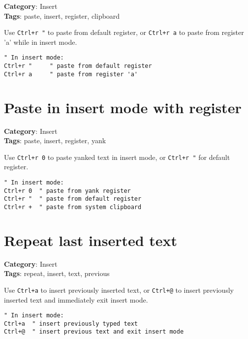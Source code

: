 {{{{{{\textbf{Category}: Insert\\ \textbf{Tags}: paste, insert, register, clipboard
\vspace{0.5cm}

Use {\footnotesize \Verb§Ctrl+r "§} to paste from default register, or {\footnotesize \Verb§Ctrl+r a§} to paste from register 'a' while in insert mode.

\begin{Exa*}{}
\begin{Verbatim}[fontsize=\footnotesize, breaklines, breakanywhere]
" In insert mode:
Ctrl+r "     " paste from default register
Ctrl+r a     " paste from register 'a'
\end{Verbatim}
\end{Exa*}

\section{Paste in insert mode with register}

\textbf{Category}: Insert\\ \textbf{Tags}: paste, insert, register, yank
\vspace{0.5cm}

Use {\footnotesize \Verb§Ctrl+r 0§} to paste yanked text in insert mode, or {\footnotesize \Verb§Ctrl+r "§} for default register.

\begin{Exa*}{}
\begin{Verbatim}[fontsize=\footnotesize, breaklines, breakanywhere]
" In insert mode:
Ctrl+r 0  " paste from yank register
Ctrl+r "  " paste from default register
Ctrl+r +  " paste from system clipboard
\end{Verbatim}
\end{Exa*}

\section{Repeat last inserted text}

\textbf{Category}: Insert\\ \textbf{Tags}: repeat, insert, text, previous
\vspace{0.5cm}

Use {\footnotesize \Verb§Ctrl+a§} to insert previously inserted text, or {\footnotesize \Verb§Ctrl+@§} to insert previously inserted text and immediately exit insert mode.

\begin{Exa*}{}
\begin{Verbatim}[fontsize=\footnotesize, breaklines, breakanywhere]
" In insert mode:
Ctrl+a  " insert previously typed text
Ctrl+@  " insert previous text and exit insert mode
\end{Verbatim}
\end{Exa*}

}}}}}}
